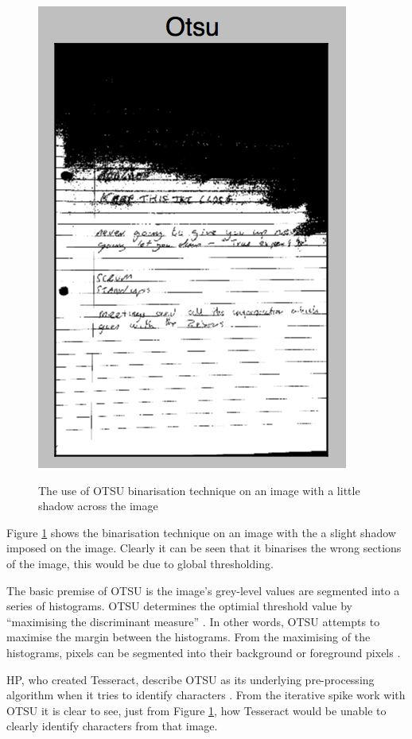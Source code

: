 \begin{figure}[H]
  \centering
  \includegraphics{images/OTSU}
  \label{fig:OTSU}
  \caption{The use of OTSU binarisation technique on an image with a little shadow across the image}
\end{figure}

Figure \ref{fig:OTSU} shows the binarisation technique on an image with the a slight shadow imposed on the image. Clearly it can be seen that it binarises the wrong sections of the image, this would be due to global thresholding.

The basic premise of OTSU is the image's grey-level values are segmented into a series of histograms. OTSU determines the optimial threshold value by ``maximising the discriminant measure'' \cite{citeulike:2917492}. In other words, OTSU attempts to maximise the margin between the histograms. From the maximising of the histograms, pixels can be segmented into their background or foreground pixels \cite{citeulike:14021372}.

HP, who created Tesseract, describe OTSU as its underlying pre-processing algorithm when it tries to identify characters \cite{citeulike:13931186}. From the iterative spike work with OTSU it is clear to see, just from Figure \ref{fig:OTSU}, how Tesseract would be unable to clearly identify characters from that image.

